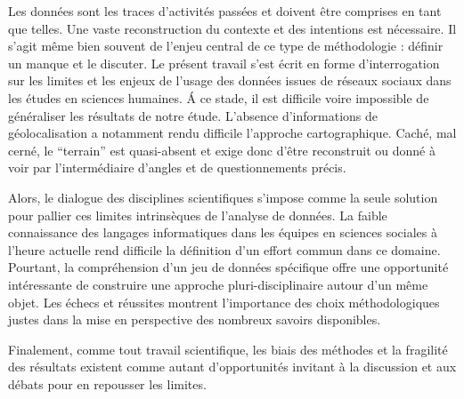 Les données sont les traces d{\textquoteright}activités passées et doivent être comprises en tant que telles. Une vaste reconstruction du contexte et des intentions est nécessaire. Il s'agit même bien souvent de l'enjeu central de ce type de méthodologie : définir un manque et le discuter. Le présent travail s'est écrit en forme d'interrogation sur les limites et les enjeux de l'usage des données issues de réseaux sociaux dans les études en sciences humaines. \'A ce stade, il est difficile voire impossible de généraliser les résultats de notre étude. L'absence d'informations de géolocalisation a notamment rendu difficile l'approche cartographique. Caché, mal cerné, le ``terrain'' est quasi-absent et exige donc d'être reconstruit ou donné à voir par l'intermédiaire d'angles et de questionnements précis. 

Alors, le dialogue des disciplines scientifiques s'impose comme la seule solution pour pallier ces limites intrinsèques de l'analyse de données. La faible connaissance des langages informatiques dans les équipes en sciences sociales à l'heure actuelle \citep{Wieviorka2013} rend difficile la définition d'un effort commun dans ce domaine. Pourtant, la compréhension d'un jeu de données spécifique offre une opportunité intéressante de construire une approche pluri-disciplinaire autour d'un même objet. Les \'echecs et réussites montrent l'importance des choix méthodologiques justes dans la mise en perspective des nombreux savoirs disponibles.


Finalement, comme tout travail scientifique, les biais des méthodes et la fragilité des résultats existent comme autant d'opportunités invitant à la discussion et aux débats pour en repousser les limites.

